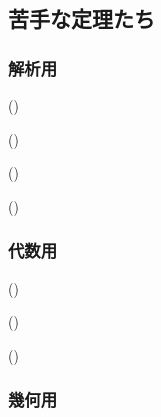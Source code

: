 \twocolumn

\ben
\item 
\een













\newpage
\subsection{苦手な定理たち}
\subsubsection{解析用}
\begin{theo} ()

\end{theo}



\begin{theo} ()

\end{theo}

\begin{theo} ()

\end{theo}

\begin{theo} ()

\end{theo}

\subsubsection{代数用}
\begin{theo} ()

\end{theo}

\begin{prop} ()

\end{prop}

\begin{prop} ()

\end{prop}




\subsubsection{幾何用}



